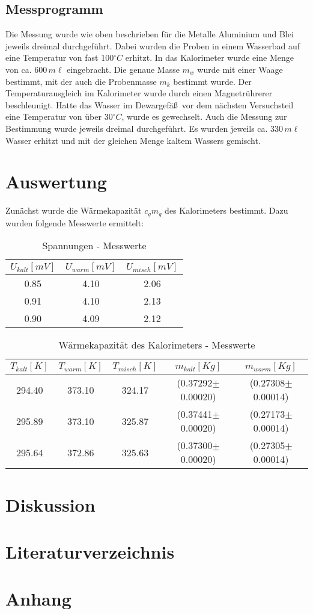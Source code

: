 \documentclass[11pt,ngerman,a4paper]{article}
\begin{document}
\subsection{Messprogramm}
Die Messung wurde wie oben beschrieben f\"ur die Metalle Aluminium und Blei jeweils dreimal durchgef\"uhrt. Dabei wurden die Proben in einem Wasserbad auf eine Temperatur von fast 100$^\circ C$ erhitzt. In das Kalorimeter wurde eine Menge von ca. $600\,m\ell$ eingebracht. Die genaue Masse $m_w$ wurde mit einer Waage bestimmt, mit der auch die Probenmasse $m_k$ bestimmt wurde. Der Temperaturausgleich im Kalorimeter wurde durch einen Magnetr\"uhrerer beschleunigt. Hatte das Wasser im Dewargef\"a\ss\ vor dem n\"achsten Versuchsteil eine Temperatur von \"uber 30$^\circ C$, wurde es gewechselt. Auch die Messung zur Bestimmung wurde jeweils dreimal durchgef\"uhrt. Es wurden jeweils ca. $330\,m\ell$ Wasser erhitzt und mit der gleichen Menge kaltem Wassers gemischt.

\section{Auswertung}
Zunächst wurde die Wärmekapazität $c_gm_g$ des Kalorimeters bestimmt. Dazu wurden folgende Messwerte ermittelt:
\begin{table}[h]
\centering
\begin{tabular}{|c|c|c|}
\hline
 $U_{kalt}[mV]$ &$U_{warm}[mV]$ &$U_{misch}[mV]$\\
\hline
0.85 & 4.10 & 2.06 \\
0.91 & 4.10 & 2.13 \\
0.90 & 4.09 & 2.12 \\
\hline
\end{tabular}
\caption{Spannungen - Messwerte}
\end{table}


\begin{table}[h]
\centering
\begin{tabular}{|c|c|c|c|c|}
\hline
$T_{kalt}[K]$ & $T_{warm}[K]$ & $T_{misch}[K]$ & $m_{kalt}[Kg]$ & $ m_{warm} [Kg]$ \\
\hline
294.40 & 373.10 & 324.17 & (0.37292$\pm$0.00020) & (0.27308$\pm$0.00014)\\
295.89 & 373.10 & 325.87 & (0.37441$\pm$0.00020) & (0.27173$\pm$0.00014)\\
295.64 & 372.86 & 325.63 & (0.37300$\pm$0.00020) & (0.27305$\pm$0.00014)\\
\hline
\end{tabular}
\caption{Wärmekapazität des Kalorimeters - Messwerte}
\end{table}



\section{Diskussion}


\section{Literaturverzeichnis}

\section{Anhang}
\end{document}
